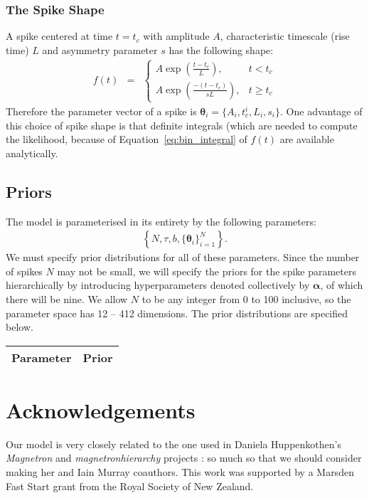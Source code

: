 \documentclass[a4paper, 11pt]{article}
\begin{document}
\subsubsection{The Spike Shape}
A spike centered at time $t=t_c$ with amplitude $A$, characteristic timescale
(rise time) $L$ and asymmetry parameter $s$ has the following shape:
\begin{eqnarray}
f(t) &=& \left\{
\begin{array}{lr}
A\exp\left(\frac{t - t_c}{L}\right), & t < t_c\\
A\exp\left(\frac{-(t - t_c)}{sL}\right), & t \geq t_c
\end{array}
\right.
\end{eqnarray}
Therefore the parameter vector of a spike is
$\boldsymbol{\theta}_i = \{A_i, t_c^i, L_i, s_i\}$. One advantage of this
choice of spike shape is that definite integrals (which are needed to compute
the likelihood, because of Equation~\ref{eq:bin_integral} of $f(t)$ are
available analytically.

\subsection{Priors}
The model is parameterised in its entirety by the following parameters:
\begin{eqnarray}
\left\{
N, \tau, b, \{\boldsymbol{\theta}_i\}_{i=1}^N
\right\}.
\end{eqnarray}
We must specify prior distributions for all of these parameters. Since the
number of spikes $N$ may not be small, we will specify the priors for the
spike parameters hierarchically by introducing hyperparameters
denoted collectively by $\boldsymbol{\alpha}$, of which there will be nine.
We allow $N$ to be any integer from 0 to 100 inclusive, so
the parameter space has 12 -- 412 dimensions. The prior distributions are
specified below.

\begin{table}[!ht]
\begin{center}
\begin{tabular}{cc}
\hline
Parameter			&		Prior\\
\hline

\end{tabular}
\end{center}
\end{table}

\section*{Acknowledgements}
Our model is very closely related to the one used in Daniela Huppenkothen's
{\it Magnetron} and {\it magnetronhierarchy} projects \citep{magnetron}: so
much so that we should consider making her and Iain Murray coauthors.
This work was supported by a Marsden Fast Start grant from the Royal Society of
New Zealand.
\end{document}
